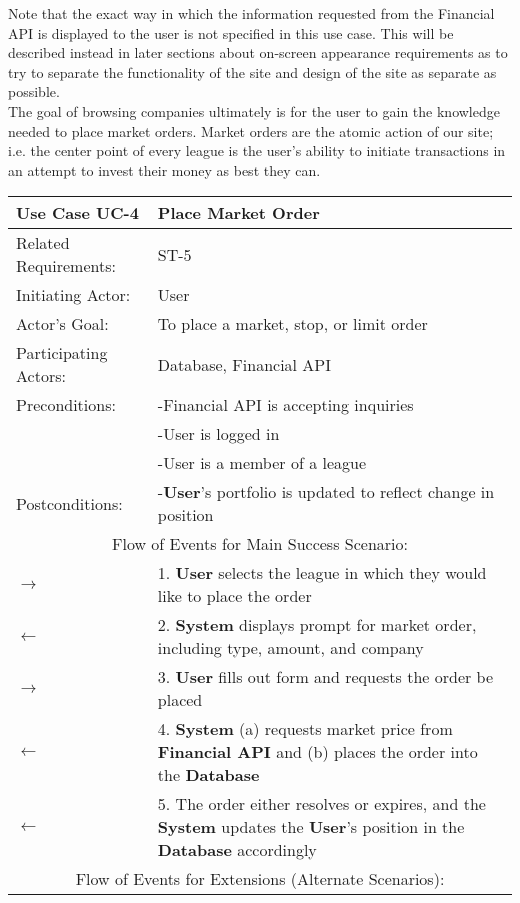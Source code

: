 Note that the exact way in which the information requested from the Financial API is displayed to the user is not specified in this use case. This will be described instead in later sections about on-screen appearance requirements as to try to separate the functionality of the site and design of the site as separate as possible. \\

The goal of browsing companies ultimately is for the user to gain the knowledge needed to place market orders. Market orders are the atomic action of our site; i.e. the center point of every league is the user's ability to initiate transactions in an attempt to invest their money as best they can. \\

\begin{centering}
\renewcommand\arraystretch{1.3} %
\begin{longtable}{|p{1.2in} p{5in}|}
\hline
\bfseries{\color{color1}Use Case UC-4} & \bfseries{\color{color1}Place Market Order} \\
\hline
Related Requirements: & ST-5 \\ 
Initiating Actor:     & User \\
Actor's Goal:         & To place a market, stop, or limit order \\
Participating Actors:  & Database, Financial API \\
Preconditions:        & -Financial API is accepting inquiries \\
 & -User is logged in \\
 & -User is a member of a league \\
Postconditions:       & -\textbf{User}'s portfolio is updated to reflect change in position \\
\hline
\multicolumn{2}{|c|}{\color{color1}Flow of Events for Main Success Scenario:}\\
\hline
$\rightarrow$ & 1. \textbf{User} selects the league in which they would like to place the order \\
$\leftarrow$ & 2. \textbf{System} displays prompt for market order, including type, amount, and company \\
$\rightarrow$ & 3. \textbf{User} fills out form and requests the order be placed \\
$\leftarrow$ & 4. \textbf{System} (a) requests market price from \textbf{Financial API} and (b) places the order into the \textbf{Database} \\
$\leftarrow$ & 5. The order either resolves or expires, and the \textbf{System} updates the \textbf{User}'s position in the \textbf{Database} accordingly \\
\hline
\multicolumn{2}{|c|}{\color{color1}Flow of Events for Extensions (Alternate Scenarios):} \\
\hline


\end{longtable}
\end{centering}

